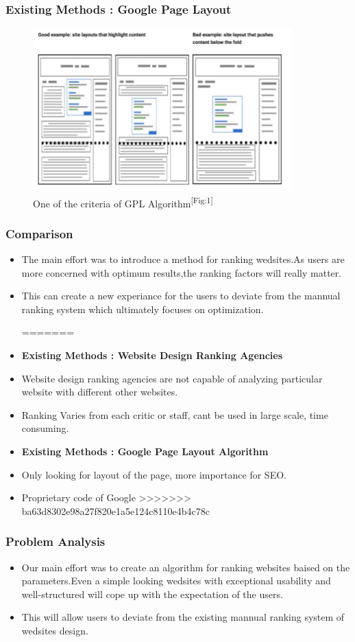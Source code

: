\documentclass[11pt]{beamer}
\begin{document}
	\begin{frame}
	\frametitle{{Existing Methods : Google Page Layout}}
		\begin{figure}
		
		\includegraphics[width=10cm]{image/gpa.png}
		\caption{One of the criteria of GPL Algorithm\textsuperscript{[Fig:1]}}
		\label{fig1:gpa}
	\end{figure}
	\end{frame}
\begin{frame}
			\frametitle{{Comparison}}
	\begin{itemize}
<<<<<<< HEAD
		\item The main effort was to introduce a method for ranking wedsites.As users are more concerned with optimum results,the ranking factors will really matter.
		
		\item This can create a new experiance for the users to deviate from the mannual ranking system which ultimately focuses on optimization. 
	   
=======
		\item \textbf{Existing Methods : Website Design Ranking Agencies}
		\item Website design ranking agencies are not capable of analyzing particular website with different other websites.
		\item Ranking Varies from each critic or staff, cant be used in large scale, time consuming.
		\item \textbf{Existing Methods : Google Page Layout Algorithm}
		\item Only looking for layout of the page, more importance for SEO.
		\item Proprietary code of Google
>>>>>>> ba63d8302e98a27f820e1a5e124c8110e4b4c78c
	\end{itemize}
\end{frame}

\begin{frame}
\frametitle{{Problem Analysis}}
\begin{itemize}
	\item Our main effort was to create an algorithm for ranking websites baised on the parameters.Even a simple looking wedsites with exceptional usability and well-structured will cope up with the expectation of the users.
	
	\item This will allow users to deviate from the existing mannual ranking system of wedsites design.
\end{itemize}
\end{frame}
\end{document}
